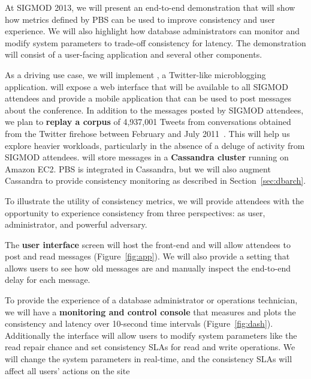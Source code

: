 At SIGMOD 2013, we will present an end-to-end demonstration that will
show how metrics defined by PBS can be used to improve consistency and
user experience. We will also highlight how database administrators
can monitor and modify system parameters to trade-off consistency for
latency. The demonstration will consist of a user-facing application
and several other components.


As a driving use case, we will implement \textbf{{\systemname}}, a
Twitter-like microblogging application. {\systemname} will expose a
web interface that will be available to all SIGMOD attendees and
provide a mobile application that can be used to post messages about
the conference. In addition to the messages posted by SIGMOD
attendees, we plan to \textbf{replay a corpus} of 4,937,001 Tweets
from conversations obtained from the Twitter firehose between February
and July 2011~\cite{ritter2010unsupervised}. This will help us explore
heavier workloads, particularly in the absence of a deluge of activity
from SIGMOD attendees. {\systemname} will store messages in a
\textbf{Cassandra cluster} running on Amazon EC2. PBS is integrated in
Cassandra, but we will also augment Cassandra to provide consistency
monitoring as described in Section~\ref{sec:dbarch}.


To illustrate the utility of consistency metrics, we will provide
attendees with the opportunity to experience consistency from three
perspectives: as user, administrator, and powerful adversary.

The \textbf{user interface} screen will host the {\systemname}
front-end and will allow attendees to post and read messages
(Figure~\ref{fig:app}). We will also provide a setting that
allows users to see how old messages are and manually inspect the
end-to-end delay for each message. %

To provide the experience of a database administrator or operations
technician, we will have a \textbf{monitoring and control console}
that measures and plots the consistency and latency over 10-second
time intervals (Figure~\ref{fig:dash}).
Additionally the interface will allow users to modify system parameters like
the read repair chance and set consistency SLAs for read and write
operations. We will change the system parameters in real-time, and the
consistency SLAs will affect all users' actions on the site

